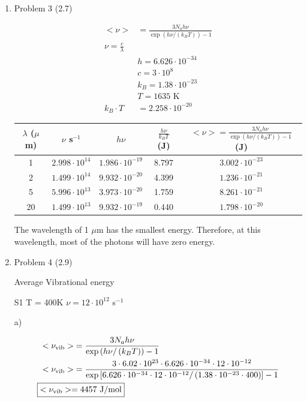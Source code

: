 \documentclass[12pt]{article}
\begin{document}
\begin{enumerate}
    \newpage
    \item Problem 3 (2.7)
    
    \begin{align*}
        <\nu> &= \frac{3N_ah\nu}{\exp\left(h\nu/\left(k_BT\right)\right)-1} \\
        \nu = \frac{c}{\lambda} \\
        & h = 6.626 \cdot 10^{-34} \\
        & c = 3 \cdot 10^{8} \\
        & k_B = 1.38 \cdot 10^{-23} \\
        & T = 1635 \text{ K} \\
        k_B \cdot T &= 2.258 \cdot 10^{-20}
    \end{align*}

    \begin{tabular}{|c|c|c|c|c|}
        \hline
        $\lambda$ ($\mu$m) & $\nu$ s$^{-1}$ & $h\nu$ & $\frac{h\nu}{k_BT}$ (J) & $<\nu> = \frac{3N_ah\nu}{\exp\left(h\nu/\left(k_BT\right)\right)-1}$ (J) \\
        \hline
        1 & $2.998\cdot10^{14}$ & $1.986\cdot10^{-19}$ & 8.797 & $3.002\cdot10^{-23}$ \\
        2 & $1.499\cdot10^{14}$ & $9.932\cdot10^{-20}$ & 4.399 & $1.236\cdot10^{-21}$ \\
        5 & $5.996\cdot10^{13}$ & $3.973\cdot10^{-20}$ & 1.759 & $8.261\cdot10^{-21}$ \\
        20 & $1.499\cdot10^{13}$ & $9.932\cdot10^{-19}$ & 0.440 & $1.798\cdot10^{-20}$ \\
        \hline
    \end{tabular}

    The wavelength of 1 $\mu$m has the smallest energy. Therefore, at this wavelength, most of the photons will have zero energy.

    \newpage
    \item Problem 4 (2.9)
    
    Average Vibrational energy

    S1 T = 400K $\nu = 12 \cdot 10^{12}$ s$^{-1}$

    a)

    \begin{align*}
        <\nu_{\text{vib}}> &= \frac{3N_ah\nu}{\exp\left(h\nu/\left(k_BT\right)\right)-1} \\
        <\nu_{\text{vib}}> &= \frac{3 \cdot 6.02 \cdot 10^{23} \cdot 6.626 \cdot 10^{-34} \cdot 12 \cdot 10^{-12}}{\exp\left[6.626 \cdot 10^{-34} \cdot 12 \cdot 10^{-12} / \left(1.38 \cdot 10^{-23} \cdot 400\right)\right]-1} \\
        \Aboxed{<\nu_{\text{vib}}> &= 4457 \text{ J/mol}}
    \end{align*}


\end{enumerate}
\end{document}
